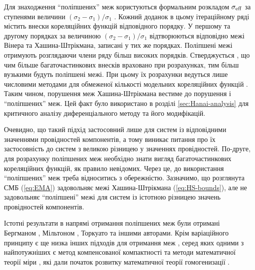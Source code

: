 \documentclass[14pt,twoside]{vakthesis}
\begin{document}
Для знаходження ``поліпшених'' меж користуються формальним розкладом $\sigma_{\rm eff}$ за ступенями величини $(\sigma_2-\sigma_1)/\sigma_1$ \cite{Torquato1991,Torquato}. Кожний доданок в цьому ітераційному ряді містить внески кореляційних функцій відповідного порядку. У першому та другому порядках за величиною $(\sigma_2-\sigma_1)/\sigma_1$ відтворюються відповідно межі Вінера та Хашина-Штрікмана, записані у тих же порядках. Поліпшені межі отримують розглядаючи члени ряду більш високих порядків.  Стверджується \cite{Torquato}, що чим більше багаточастинкових внесків враховано при розрахунках, тим більш вузькими будуть поліпшені межі. При цьому їх розрахунки ведуться лише числовими методами для обмеженої кількості модельних кореляційних функцій \cite{Cule1999}. Таким чином, порушення меж Хашина-Штрікмана вестиме до порушення і ``поліпшених'' меж. Цей факт було використано в розділі \ref{sec:Hanai-analysis} для критичного аналізу диференціального методу та його модифікацій.

Очевидно, що такий підхід застосовний лише для систем із відповідними значеннями провідностей компонентів, а тому виникає питання про їх застосовність до систем з великою різницею у значеннях провідностей. По-друге, для розрахунку поліпшених меж необхідно знати вигляд багаточастинкових кореляційних функцій, як правило невідомих. 
Через це, до використання ``поліпшених'' меж треба відноситись з обережністю. 
Зазначимо, що розглянута СМБ (\ref{eq:EMA}) задовольняє межі Хашина-Штрік\-мана (\ref{eq:HS-bounds}), але не задовольняє ``поліпшені'' межі \cite{Torquato} для систем із істотною різницею значень провідностей компонентів.

Істотні результати в напрямі отримання поліпшених меж були отримані Бергманом \cite{Bergman1978,Bergman1992}, Мільтоном \cite{Milton}, Торкуато \cite{Torquato1991,Torquato} та іншими авторами. Крім варіаційного принципу є ще низка інших підходів для отримання меж \cite{Milton,Torquato,Sihvola1999,Cioranescu,Jikov}, серед яких одними з найпотужніших є метод компенсованої компактності \cite{Tartar1979,Milton} та методи математичної теорії міри  \cite{Tartar1990}, які дали початок розвитку математичної теорії гомогенизації \cite{Cioranescu,Jikov}.
\end{document}
